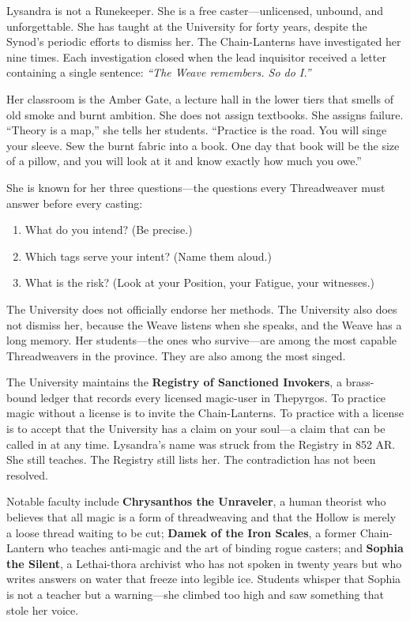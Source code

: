 \documentclass[10pt,twocolumn]{book}
\begin{document}
Lysandra is not a Runekeeper. She is a free caster---unlicensed, unbound, and unforgettable. She has taught at the University for forty years, despite the Synod's periodic efforts to dismiss her. The Chain-Lanterns have investigated her nine times. Each investigation closed when the lead inquisitor received a letter containing a single sentence: \textit{``The Weave remembers. So do I.''}

Her classroom is the Amber Gate, a lecture hall in the lower tiers that smells of old smoke and burnt ambition. She does not assign textbooks. She assigns failure. ``Theory is a map,'' she tells her students. ``Practice is the road. You will singe your sleeve. Sew the burnt fabric into a book. One day that book will be the size of a pillow, and you will look at it and know exactly how much you owe.''

She is known for her three questions---the questions every Threadweaver must answer before every casting:
\begin{enumerate}[noitemsep]
\item What do you intend? (Be precise.)
\item Which tags serve your intent? (Name them aloud.)
\item What is the risk? (Look at your Position, your Fatigue, your witnesses.)
\end{enumerate}

The University does not officially endorse her methods. The University also does not dismiss her, because the Weave listens when she speaks, and the Weave has a long memory. Her students---the ones who survive---are among the most capable Threadweavers in the province. They are also among the most singed.

The University maintains the \textbf{Registry of Sanctioned Invokers}, a brass-bound ledger that records every licensed magic-user in Thepyrgos. To practice magic without a license is to invite the Chain-Lanterns. To practice with a license is to accept that the University has a claim on your soul---a claim that can be called in at any time. Lysandra's name was struck from the Registry in 852 AR. She still teaches. The Registry still lists her. The contradiction has not been resolved.

Notable faculty include \textbf{Chrysanthos the Unraveler}, a human theorist who believes that all magic is a form of threadweaving and that the Hollow is merely a loose thread waiting to be cut; \textbf{Damek of the Iron Scales}, a former Chain-Lantern who teaches anti-magic and the art of binding rogue casters; and \textbf{Sophia the Silent}, a Lethai-thora archivist who has not spoken in twenty years but who writes answers on water that freeze into legible ice. Students whisper that Sophia is not a teacher but a warning---she climbed too high and saw something that stole her voice.
\end{document}
